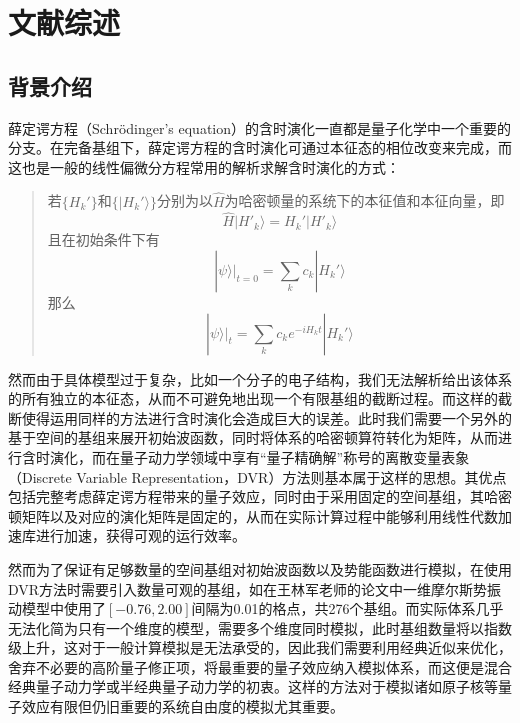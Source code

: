 \cleardoublepage
\chapter{文献综述}

\section{背景介绍}
薛定谔方程（Schr\"odinger's equation）的含时演化一直都是量子化学中一个重要的分支。在完备基组下，薛定谔方程的含时演化可通过本征态的相位改变来完成，而这也是一般的线性偏微分方程常用的解析求解含时演化的方式\cite{courant2008methods}：

\begin{quote}
若$\{H_k'\}$和$\{|H_k'\rangle\}$分别为以$\hat{H}$为哈密顿量的系统下的本征值和本征向量，即
\begin{equation}
	\hat{H} |H'_k\rangle = H_k' |H'_k\rangle
\end{equation}
且在初始条件下有
\begin{equation}
	|\psi \rangle\big|_{t=0} = \sum_k c_k |H_k'\rangle
\end{equation}
那么
\begin{equation}
	|\psi \rangle\big|_{t} = \sum_k c_k e^{-iH_k t}|H_k'\rangle
\end{equation}
\end{quote}

然而由于具体模型过于复杂，比如一个分子的电子结构，我们无法解析给出该体系的所有独立的本征态，从而不可避免地出现一个有限基组的截断过程。而这样的截断使得运用同样的方法进行含时演化会造成巨大的误差。此时我们需要一个另外的基于空间的基组来展开初始波函数，同时将体系的哈密顿算符转化为矩阵，从而进行含时演化，而在量子动力学领域中享有``量子精确解''称号的离散变量表象（Discrete Variable Representation，DVR）方法则基本属于这样的思想\cite{colbert1992novel}。其优点包括完整考虑薛定谔方程带来的量子效应，同时由于采用固定的空间基组，其哈密顿矩阵以及对应的演化矩阵是固定的，从而在实际计算过程中能够利用线性代数加速库进行加速，获得可观的运行效率。

然而为了保证有足够数量的空间基组对初始波函数以及势能函数进行模拟，在使用DVR方法时需要引入数量可观的基组，如在王林军老师的论文\cite{LinjunSemiclassical}中一维摩尔斯势振动模型中使用了$[-0.76,2.00]$间隔为0.01的格点，共276个基组。而实际体系几乎无法化简为只有一个维度的模型，需要多个维度同时模拟，此时基组数量将以指数级上升，这对于一般计算模拟是无法承受的，因此我们需要利用经典近似来优化，舍弃不必要的高阶量子修正项，将最重要的量子效应纳入模拟体系，而这便是混合经典量子动力学或半经典量子动力学的初衷。这样的方法对于模拟诸如原子核等量子效应有限但仍旧重要的系统自由度的模拟尤其重要。

